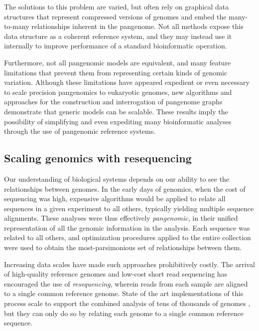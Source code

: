 The solutions to this problem are varied, but often rely on graphical data structures that represent compressed versions of genomes and embed the many-to-many relationships inherent in the pangenome.
Not all methods expose this data structure as a coherent reference system, and they may instead use it internally to improve performance of a standard bioinformatic operation.

Furthermore, not all pangenomic models are equivalent, and many feature limitations that prevent them from representing certain kinds of genomic variation.
Although these limitations have appeared expedient or even necessary to scale precision pangenomics to eukaryotic genomes, new algorithms and approaches for the construction and interrogation of pangenome graphs demonstrate that generic models can be scalable.
These results imply the possibility of simplifying and even expediting many bioinformatic analyses through the use of pangenomic reference systems.

\subsection{Scaling genomics with resequencing}

Our understanding of biological systems depends on our ability to see the relationships between genomes.
In the early days of genomics, when the cost of sequencing was high, expensive algorithms would be applied to relate all sequences in a given experiment to all others, typically yielding multiple sequence alignments.
These analyses were thus effectively \emph{pangenomic}, in their unified representation of all the genomic information in the analysis.
Each sequence was related to all others, and optimization procedures applied to the entire collection were used to obtain the most-parsimonious set of relationships between them.

Increasing data scales have made such approaches prohibitively costly.
The arrival of high-quality reference genomes and low-cost short read sequencing has encouraged the use of \emph{resequencing}, wherein reads from each sample are aligned to a single common reference genome.
State of the art implementations of this process scale to support the combined analysis of tens of thousands of genomes \cite{Poplin_2017}, but they can only do so by relating each genome to a single common reference sequence.

